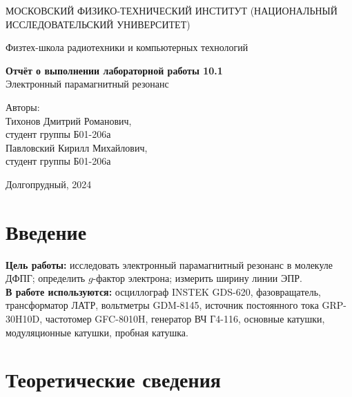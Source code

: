 \documentclass[a4paper, 12pt]{article}
\begin{document}
    \begin{titlepage}
	\begin{center}
            {\large МОСКОВСКИЙ ФИЗИКО-ТЕХНИЧЕСКИЙ ИНСТИТУТ (НАЦИОНАЛЬНЫЙ ИССЛЕДОВАТЕЛЬСКИЙ УНИВЕРСИТЕТ)}
	\end{center}
 
	\begin{center}
		{\large Физтех-школа радиотехники и компьютерных технологий}
	\end{center}
	
	\vspace{8cm}
	{\LARGE
		\begin{center}
                {\bf Отчёт о выполнении лабораторной работы 10.1}\\
                Электронный парамагнитный резонанс
		\end{center}
	}
	\vspace{4cm}
	\begin{flushright}
		{\Large Авторы: \\ 
        Тихонов Дмитрий Романович, \\ студент группы Б01-206а \\
        Павловский Кирилл Михайлович, \\ студент группы Б01-206а}
	\end{flushright}
	\vspace{4cm}
	\begin{center}
		\Large Долгопрудный, 2024
	\end{center}
    \end{titlepage}


    \section{Введение}

    \noindent \textbf{Цель работы:} исследовать электронный парамагнитный резонанс в молекуле ДФПГ; определить $g$-фактор электрона; измерить ширину линии ЭПР. \\
	

    \noindent \textbf{В работе используются:} осциллограф INSTEK GDS-620, фазовращатель, трансформатор ЛАТР, вольтметры GDM-8145, источник постоянного тока GRP-30H10D, частотомер GFC-8010H, генератор ВЧ Г4-116, основные катушки, модуляционные катушки, пробная катушка.
    
    \section{Теоретические сведения}
\end{document}
